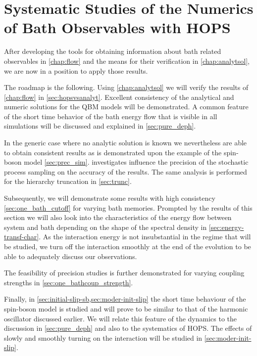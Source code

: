 \chapter{Systematic Studies of the Numerics of Bath Observables with
  HOPS}
\label{chap:numres}
After developing the tools for obtaining information about bath
related observables in \cref{chap:flow} and the means for their
verification in \cref{chap:analytsol}, we are now in a position to
apply those results.

The roadmap is the following. Using \cref{chap:analytsol} we will
verify the results of \cref{chap:flow} in
\cref{sec:hopsvsanalyt}. Excellent consistency of the analytical and
numeric solutions for the QBM models will be demonstrated.  A common
feature of the short time behavior of the bath energy flow that is
visible in all simulations will be discussed and explained in
\cref{sec:pure_deph}.

In the generic case where no analytic solution is known we
nevertheless are able to obtain consistent results as is demonstrated
upon the example of the spin-boson model \cref{sec:prec_sim}.
 investigates influence the precision of the
stochastic process sampling on the accuracy of the results. The same
analysis is performed for the hierarchy truncation in
\cref{sec:trunc}.

Subsequently, we will demonstrate some results with high consistency
\cref{sec:one_bath_cutoff} for varying bath memories.  Prompted by the
results of this section we will also look into the characteristics of
the energy flow between system and bath depending on the shape of the
spectral density in \cref{sec:energy-transf-char}. As the interaction
energy is not insubstantial in the regime that will be studied, we
turn off the interaction smoothly at the end of the evolution to be
able to adequately discuss our observations.

The feasibility of precision studies is further demonstrated for
varying coupling strengths in \cref{sec:one_bathcoup_strength}.

Finally, in \cref{sec:initial-slip-sb,sec:moder-init-slip} the short
time behaviour of the spin-boson model is studied and will prove to be
similar to that of the harmonic oscillator discussed earlier. We will
relate this feature of the dynamics to the discussion in
\cref{sec:pure_deph} and also to the systematics of HOPS. The effects
of slowly and smoothly turning on the interaction will be studied in
\cref{sec:moder-init-slip}.

